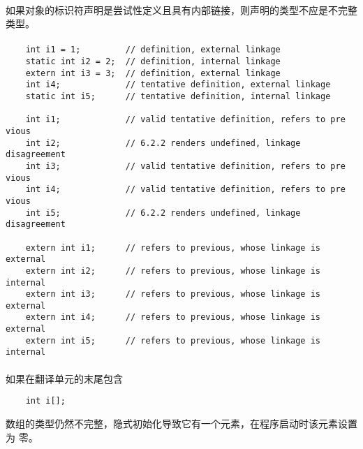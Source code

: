 {\paragraph{}
如果对象的标识符声明是尝试性定义且具有内部链接，则声明的类型不应是不完整类型。

\paragraph{}
\ex
\begin{lstlisting}
    int i1 = 1;         // definition, external linkage
    static int i2 = 2;  // definition, internal linkage
    extern int i3 = 3;  // definition, external linkage
    int i4;             // tentative definition, external linkage
    static int i5;      // tentative definition, internal linkage

    int i1;             // valid tentative definition, refers to pre vious
    int i2;             // 6.2.2 renders undefined, linkage disagreement
    int i3;             // valid tentative definition, refers to pre vious
    int i4;             // valid tentative definition, refers to pre vious
    int i5;             // 6.2.2 renders undefined, linkage disagreement

    extern int i1;      // refers to previous, whose linkage is external
    extern int i2;      // refers to previous, whose linkage is internal
    extern int i3;      // refers to previous, whose linkage is external
    extern int i4;      // refers to previous, whose linkage is external
    extern int i5;      // refers to previous, whose linkage is internal
\end{lstlisting}

\paragraph{}
\ex 如果在翻译单元的末尾包含
\begin{lstlisting}
    int i[];
\end{lstlisting}
数组的类型仍然不完整，隐式初始化导致它有一个元素，在程序启动时该元素设置为
零。

\syntax
}
